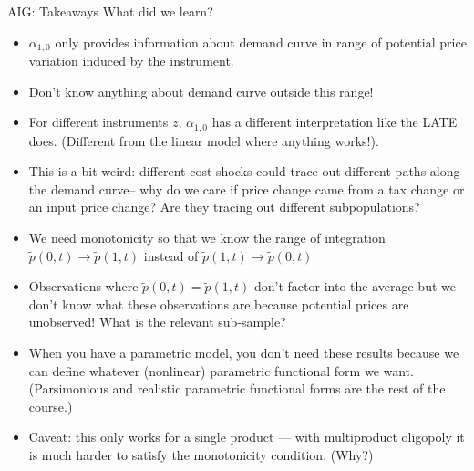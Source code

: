 \documentclass[aspectratio=169,11pt]{beamer}
\begin{document}
\begin{frame}{AIG: Takeaways}
\footnotesize
What did we learn?
\begin{itemize}
\item $\alpha_{1,0}$ only provides information about demand curve in range of potential price variation induced by the instrument.
\item Don't know anything about demand curve outside this range!
\item For different instruments $z$, $\alpha_{1,0}$ has a different interpretation like the LATE does. (Different from the linear model where anything works!).
\item This is a bit weird: different cost shocks could trace out different paths along the demand curve-- why do we care if price change came from a tax change or an input price change? Are they tracing out different subpopulations?
\item We need monotonicity so that we know the range of integration $\tilde{p}(0,t) \rightarrow \tilde{p}(1,t)$ instead of $\tilde{p}(1,t) \rightarrow \tilde{p}(0,t)$
\item Observations where $\tilde{p}(0,t) = \tilde{p}(1,t)$ don't factor into the average but we don't know what these observations are because potential prices are unobserved! What is the relevant sub-sample?
\item When you have a parametric model, you don't need these results because we can define whatever (nonlinear) parametric functional form we want. (Parsimonious and realistic parametric functional forms are the rest of the course.)
\item Caveat: this only works for a single product --- with multiproduct oligopoly it is much harder to satisfy the \alert{monotonicity} condition. (Why?)
\end{itemize}
\end{frame}
\end{document}
